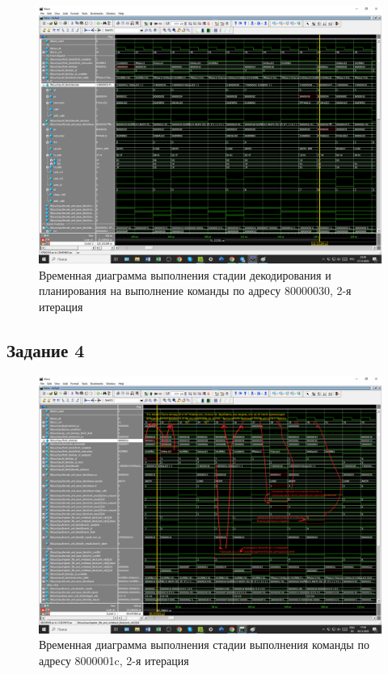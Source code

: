 \documentclass[a4paper,oneside,14pt]{extarticle}
\begin{document}
\begin{figure}[H]
	\centering
	\includegraphics[width=1\textwidth]{img/3.png}
    \caption{Временная диаграмма выполнения стадии декодирования и планирования на выполнение команды по адресу 80000030, 2-я итерация}
	\label{fig:3}
\end{figure}

\subsection{Задание 4}

\begin{figure}[H]
	\centering
	\includegraphics[width=1\textwidth]{img/4.png}
    \caption{Временная диаграмма выполнения стадии выполнения команды по адресу 8000001c, 2-я итерация}
	\label{fig:4}
\end{figure}
\end{document}
